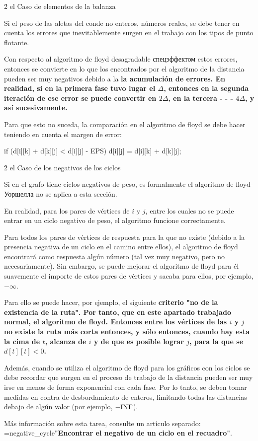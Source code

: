 \h2{ el Caso de elementos de la balanza }

Si el peso de las aletas del conde no enteros, números reales, se debe tener en cuenta los errores que inevitablemente surgen en el trabajo con los tipos de punto flotante.

Con respecto al algoritmo de floyd desagradable спецэффектом estos errores, entonces se convierte en lo que los encontrados por el algoritmo de la distancia pueden ser muy negativos debido a la \bf{la acumulación de errores}. En realidad, si en la primera fase tuvo lugar el $\Delta$, entonces en la segunda iteración de ese error se puede convertir en $2 \Delta$, en la tercera - - - $4 \Delta$, y así sucesivamente.

Para que esto no suceda, la comparación en el algoritmo de floyd se debe hacer teniendo en cuenta el margen de error:

\code
if (d[i][k] + d[k][j] < d[i][j] - EPS)
d[i][j] = d[i][k] + d[k][j];
\endcode


\h2{ el Caso de los negativos de los ciclos }

Si en el grafo tiene ciclos negativos de peso, es formalmente el algoritmo de floyd-Уоршелла no se aplica a esta sección.

En realidad, para los pares de vértices de $i$ y $j$, entre los cuales no se puede entrar en un ciclo negativo de peso, el algoritmo funcione correctamente.

Para todos los pares de vértices de respuesta para la que no existe (debido a la presencia negativa de un ciclo en el camino entre ellos), el algoritmo de floyd encontrará como respuesta algún número (tal vez muy negativo, pero no necesariamente). Sin embargo, se puede mejorar el algoritmo de floyd para él suavemente el importe de estos pares de vértices y sacaba para ellos, por ejemplo, $- \infty$.

Para ello se puede hacer, por ejemplo, el siguiente \bf{criterio} "no de la existencia de la ruta". Por tanto, que en este apartado trabajado normal, el algoritmo de floyd. Entonces entre los vértices de las $i$ y $j$ no existe la ruta más corta entonces, y sólo entonces, cuando hay esta la cima de $t$, alcanza de $i$ y de que es posible lograr $j$, para la que se $d[t][t] < 0$.

Además, cuando se utiliza el algoritmo de floyd para los gráficos con los ciclos se debe recordar que surgen en el proceso de trabajo de la distancia pueden ser muy irse en menos de forma exponencial con cada fase. Por lo tanto, se deben tomar medidas en contra de desbordamiento de enteros, limitando todas las distancias debajo de algún valor (por ejemplo, $- {\rm INF}$).

Más información sobre esta tarea, consulte un artículo separado: \algohref=negative_cycle{\bf{"Encontrar el negativo de un ciclo en el recuadro"}}.
